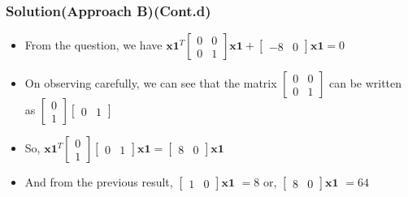 \documentclass{beamer}
\begin{document}
\begin{frame}
\frametitle{Solution(Approach B)(Cont.d)}
\begin{itemize}
	\item<1-> From the question, we have \newline
	$\mathbf{x1}^T \begin{bmatrix} 0 & 0 \\0 & 1
	\end{bmatrix} \mathbf{x1} + \begin{bmatrix} -8 & 0
	\end{bmatrix} \mathbf{x1} = 0$ \newline
	\newline
	\item<2-> On observing carefully, we can see that the matrix $\begin{bmatrix} 0 & 0 \\0 & 1
	\end{bmatrix}$ can be written as  $\begin{bmatrix}0 \\ 1
\end{bmatrix}\begin{bmatrix}0 & 1
\end{bmatrix}$
	\item<3-> So, 
	$\mathbf{x1}^T \begin{bmatrix}0 \\ 1
	\end{bmatrix}\begin{bmatrix}0 & 1
	\end{bmatrix} \mathbf{x1} = \begin{bmatrix} 8 & 0
	\end{bmatrix} \mathbf{x1} $ \newline
	\newline
	\item<4-> And from the previous result, $\begin{bmatrix} 1 & 0
	\end{bmatrix} \mathbf{x1}$  $ = 8$ \newline or, $\begin{bmatrix} 8 & 0
	\end{bmatrix} \mathbf{x1}$  $ = 64$

\end{itemize}
\end{frame}
\end{document}
